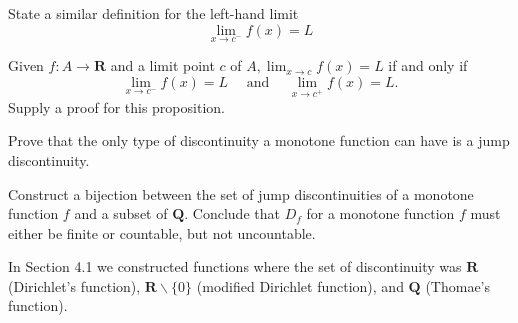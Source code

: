 \begin{exercise}
  State a similar definition for the left-hand limit
  $$
  \lim _{x \rightarrow c^{-}} f(x)=L
  $$
\end{exercise}
\begin{solution}
  \TODO
\end{solution}

\begin{exercise}
  Given $f: A \rightarrow \mathbf{R}$ and a limit point $c$ of $A, \lim _{x \rightarrow c} f(x)=L$ if and only if
  $$
  \lim _{x \rightarrow c^{-}} f(x)=L \quad \text { and } \quad \lim _{x \rightarrow c^{+}} f(x)=L .
  $$
  Supply a proof for this proposition.
\end{exercise}
\begin{solution}
  \TODO
\end{solution}

\begin{exercise}
  Prove that the only type of discontinuity a monotone function can have is a jump discontinuity.
\end{exercise}
\begin{solution}
  \TODO
\end{solution}

\begin{exercise}
  Construct a bijection between the set of jump discontinuities of a monotone function $f$ and a subset of $\mathbf{Q}$. Conclude that $D_{f}$ for a monotone function $f$ must either be finite or countable, but not uncountable.
\end{exercise}
\begin{solution}
  \TODO
\end{solution}

\begin{exercise}
  In Section 4.1 we constructed functions where the set of discontinuity was $\mathbf{R}$ (Dirichlet's function), $\mathbf{R} \backslash\{0\}$ (modified Dirichlet function), and $\mathbf{Q}$ (Thomae's function).

\end{exercise}
\begin{solution}
  \TODO
\end{solution}

